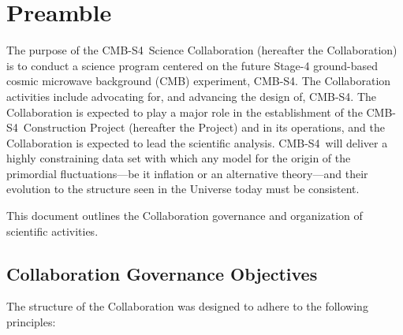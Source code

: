 \documentclass[12pt]{article}
\newcommand{\Comment}[1]{\textcolor{Blue}{(Comment: #1)}}
\newcommand\collabname{CMB-S4}
\begin{document}
\thispagestyle{empty}

\newpage

\tableofcontents


\newpage

\section{Preamble}

The purpose of the \collabname\ Science Collaboration (hereafter the Collaboration) is to conduct a science program centered on the future Stage-4 ground-based cosmic microwave background (CMB) experiment, \collabname. The Collaboration activities include advocating for, and advancing the design of, \collabname. The Collaboration is expected to play a major role in the establishment of the \collabname\ Construction Project (hereafter the Project) and in its operations, and the Collaboration is expected to lead the scientific analysis. \collabname\ will deliver a highly constraining data set with which any model for the origin of the primordial fluctuations---be it inflation or an alternative theory---and their evolution to the structure seen in the Universe today must be consistent. 

This document outlines the Collaboration governance and organization of scientific activities.

\subsection{Collaboration Governance Objectives}

 The structure of the Collaboration was designed to adhere to the following principles:
\end{document}
